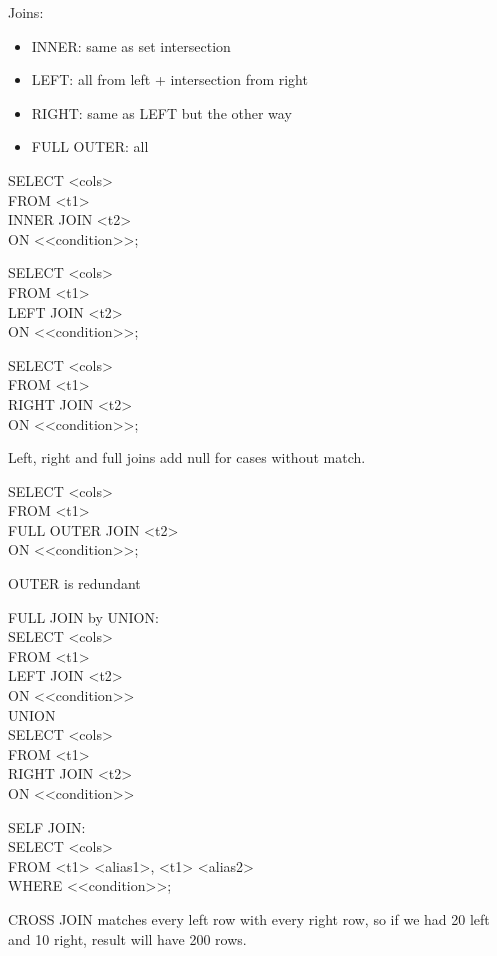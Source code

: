 \documentclass{article}
\begin{document}
    Joins:
    \begin{itemize}
        \item INNER: same as set intersection
        \item LEFT:  all from left + intersection from right
        \item RIGHT: same as LEFT but the other way
        \item FULL OUTER: all
    \end{itemize}

    SELECT <cols> \\
    FROM <t1> \\
    INNER JOIN <t2> \\
    ON <<condition>>;

    SELECT <cols> \\
    FROM <t1> \\
    LEFT JOIN <t2> \\
    ON <<condition>>;

    SELECT <cols> \\
    FROM <t1> \\
    RIGHT JOIN <t2> \\
    ON <<condition>>;

    Left, right and full joins add null for cases without match.

    SELECT <cols> \\
    FROM <t1> \\
    FULL OUTER JOIN <t2> \\
    ON <<condition>>;

    OUTER is redundant

    FULL JOIN by UNION: \\
    SELECT <cols> \\
    FROM <t1> \\
    LEFT JOIN <t2> \\
    ON <<condition>> \\
    UNION \\
    SELECT <cols> \\
    FROM <t1> \\
    RIGHT JOIN <t2> \\
    ON <<condition>>

    SELF JOIN: \\
    SELECT <cols> \\
    FROM <t1> <alias1>, <t1> <alias2> \\
    WHERE <<condition>>;

    CROSS JOIN matches every left row with every right row,
    so if we had 20 left and 10 right, result will have 200 rows.
\end{document}
